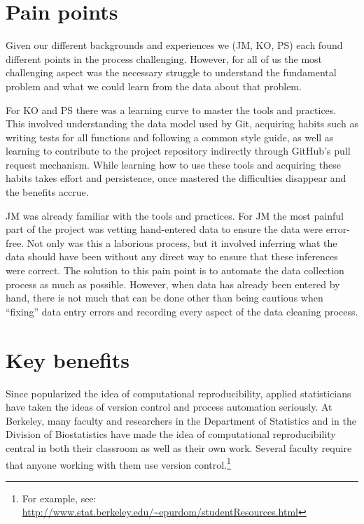 \documentclass[]{article}
\begin{document}
\section{Pain points}\label{pain-points}

Given our different backgrounds and experiences we (JM, KO, PS) each found
different points in the process challenging. 
However, for all of us the most challenging aspect was the necessary
struggle to understand the fundamental problem and what we could learn
from the data about that problem.

For KO and PS there was a learning curve to master the tools and practices.
This involved understanding the data model used by Git, acquiring habits such
as writing tests for all functions and following a common style guide, as well
as learning to contribute to the project repository indirectly through GitHub's
pull request mechanism.
While learning how to use these tools and acquiring these habits takes effort
and persistence, once mastered the difficulties disappear and the benefits
accrue.

JM was already familiar with the tools and practices.
For JM the most painful part of the project was vetting hand-entered data
to ensure the data were error-free.
Not only was this a laborious process, but it involved inferring what the data
should have been without any direct way to ensure that these inferences were
correct.
The solution to this pain point is to automate the data collection process as
much as possible.
However, when data has already been entered by hand, there is not much that can
be done other than being cautious when ``fixing'' data entry errors and recording
every aspect of the data cleaning process.

\section{Key benefits}\label{key-benefits}

Since \citet{buckheit1995wavelab} popularized the idea of computational
reproducibility, applied statisticians have taken the ideas of version control
and process automation seriously.
At Berkeley, many faculty and researchers in the Department of Statistics and
in the Division of Biostatistics have made the idea of computational
reproducibility central in both their classroom as well as their own work.
Several faculty require that anyone working with them use version
control.\footnote{For example, see:
\url{http://www.stat.berkeley.edu/~epurdom/studentResources.html}}
\end{document}
